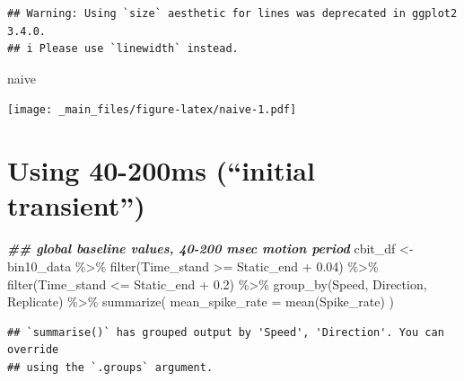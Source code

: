 \documentclass[
]{book}
\newenvironment{Shaded}{\begin{snugshade}}{\end{snugshade}}
\newcommand{\AttributeTok}[1]{\textcolor[rgb]{0.77,0.63,0.00}{#1}}
\newcommand{\DocumentationTok}[1]{\textcolor[rgb]{0.56,0.35,0.01}{\textbf{\textit{#1}}}}
\newcommand{\FloatTok}[1]{\textcolor[rgb]{0.00,0.00,0.81}{#1}}
\newcommand{\FunctionTok}[1]{\textcolor[rgb]{0.00,0.00,0.00}{#1}}
\newcommand{\NormalTok}[1]{#1}
\newcommand{\OtherTok}[1]{\textcolor[rgb]{0.56,0.35,0.01}{#1}}
\newcommand{\SpecialCharTok}[1]{\textcolor[rgb]{0.00,0.00,0.00}{#1}}
\begin{document}
\begin{verbatim}
## Warning: Using `size` aesthetic for lines was deprecated in ggplot2 3.4.0.
## i Please use `linewidth` instead.
\end{verbatim}

\begin{Shaded}
\begin{Highlighting}[]
\NormalTok{naive}
\end{Highlighting}
\end{Shaded}

\texttt{[image: \_main\_files/figure-latex/naive-1.pdf]}

\hypertarget{using-40-200ms-initial-transient}{%
\section{Using 40-200ms (``initial transient'')}\label{using-40-200ms-initial-transient}}

\begin{Shaded}
\begin{Highlighting}[]
\DocumentationTok{\#\# global baseline values, 40{-}200 msec motion period}
\NormalTok{cbit\_df }\OtherTok{\textless{}{-}}
\NormalTok{  bin10\_data }\SpecialCharTok{\%\textgreater{}\%}
  \FunctionTok{filter}\NormalTok{(Time\_stand }\SpecialCharTok{\textgreater{}=}\NormalTok{ Static\_end }\SpecialCharTok{+} \FloatTok{0.04}\NormalTok{) }\SpecialCharTok{\%\textgreater{}\%}
  \FunctionTok{filter}\NormalTok{(Time\_stand }\SpecialCharTok{\textless{}=}\NormalTok{ Static\_end }\SpecialCharTok{+} \FloatTok{0.2}\NormalTok{) }\SpecialCharTok{\%\textgreater{}\%}
  \FunctionTok{group\_by}\NormalTok{(Speed, Direction, Replicate) }\SpecialCharTok{\%\textgreater{}\%}
  \FunctionTok{summarize}\NormalTok{(}
    \AttributeTok{mean\_spike\_rate =} \FunctionTok{mean}\NormalTok{(Spike\_rate)}
\NormalTok{  )}
\end{Highlighting}
\end{Shaded}

\begin{verbatim}
## `summarise()` has grouped output by 'Speed', 'Direction'. You can override
## using the `.groups` argument.
\end{verbatim}
\end{document}
